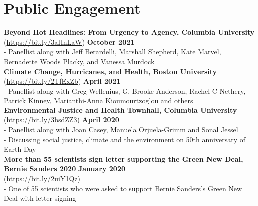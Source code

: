 \section*{Public Engagement}



\noindent \textbf{Beyond Hot Headlines: From Urgency to Agency, Columbia University} (\href{https://www.youtube.com/watch?v=4PMs3LOD13k}{https://bit.ly/3aHnLaW}) \hfill \textbf{October 2021}\\
\noindent - Panellist along with Jeff Berardelli, Marshall Shepherd, Kate Marvel, Bernadette Woods Placky, and Vanessa Murdock\\

\noindent \textbf{Climate Change, Hurricanes, and Health, Boston University} (\href{https://bit.ly/2TfExZb}{https://bit.ly/2TfExZb}) \hfill \textbf{April 2021}\\
\noindent - Panellist along with Greg Wellenius, G. Brooke Anderson, Rachel C Nethery, Patrick Kinney, Marianthi-Anna Kioumourtzoglou and others\\

\noindent \textbf{Environmental Justice and Health Townhall, Columbia University} (\href{https://bit.ly/3bsdZZ3}{https://bit.ly/3bsdZZ3}) \hfill \textbf{April 2020}\\
\noindent - Panellist along with Joan Casey, Manuela Orjuela-Grimm and Sonal Jessel\\
\noindent - Discussing social justice, climate and the environment on 50th anniversary of Earth Day\\


\noindent \textbf{More than 55 scientists sign letter supporting the Green New Deal, Bernie Sanders 2020} \hfill \textbf{January 2020}\\ (\href{https://bit.ly/2uiY1Qz}{https://bit.ly/2uiY1Qz})\\
\noindent - One of 55 scientists who were asked to support Bernie Sanders's Green New Deal with letter signing\\

